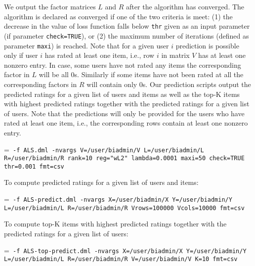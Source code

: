  We output the factor matrices $L$ and $R$ after the algorithm has converged. The algorithm is declared as converged if one of the two criteria is meet: 
 (1) the decrease in the value of loss function falls below {\tt thr}
 given as an input parameter (if parameter {\tt check=TRUE}), or (2) the maximum number of iterations (defined as parameter {\tt maxi}) is reached. 
 Note that for a given user $i$ prediction is possible only if user $i$ has rated at least one item, i.e., row $i$ in matrix $V$ has at least one nonzero entry. 
 In case, some users have not rated any items the corresponding factor in $L$ will be all 0s.
 Similarly if some items have not been rated at all the corresponding factors in $R$  will contain only 0s. 
 Our prediction scripts output the predicted ratings for a given list of users and items as well as the top-K items with highest predicted ratings together with the predicted ratings for a given list of users. Note that the predictions will only be provided for the users who have rated at least one item, i.e., the corresponding rows contain at least one nonzero entry. 

 

 
 
  
 \smallskip
 \smallskip
  
% 		
  
 {\hangindent=\parindent\noindent\tt
 	\hml -f ALS.dml -nvargs V=/user/biadmin/V L=/user/biadmin/L R=/user/biadmin/R rank=10 reg="wL2" lambda=0.0001 maxi=50 check=TRUE thr=0.001 fmt=csv	
 	
 }
 
 \noindent To compute predicted ratings for a given list of users and items:
 
 {\hangindent=\parindent\noindent\tt
  	\hml -f ALS-predict.dml -nvargs X=/user/biadmin/X Y=/user/biadmin/Y L=/user/biadmin/L R=/user/biadmin/R  Vrows=100000 Vcols=10000 fmt=csv	
  	
 }
  
 \noindent To compute top-K items with highest predicted ratings together with the predicted ratings for a given list of users:
 
 {\hangindent=\parindent\noindent\tt
   	\hml -f ALS-top-predict.dml -nvargs X=/user/biadmin/X Y=/user/biadmin/Y L=/user/biadmin/L R=/user/biadmin/R V=/user/biadmin/V K=10 fmt=csv	
   	
 }


%
 
 